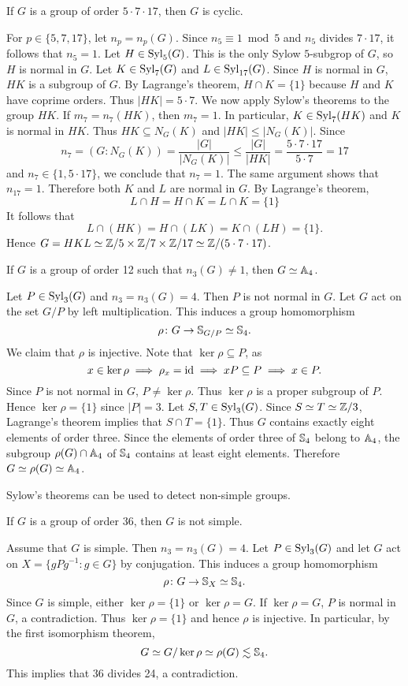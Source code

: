 \begin{example}
If $G$ is a group of order $5\cdot 7\cdot 17$, then $G$ is cyclic.

For $p\in\{5,7,17\}$, let $n_p=n_p(G)$. Since $n_5\equiv 1\bmod 5$ and $n_5$ divides $7\cdot 17$, it follows that 
$n_5=1$. Let $H\in\mathrm{Syl}_5(G)$. This is the only Sylow $5$-subgrop of $G$, 
so $H$ is normal in $G$. Let $K\in\mathrm{Syl}_7(G)$ and $L\in\mathrm{Syl}_{17}(G)$. Since $H$ is normal in $G$, $HK$ is a subgroup of $G$. By Lagrange's theorem, $H\cap K=\{1\}$ because $H$ and $K$ have coprime orders.
Thus  $|HK|=5\cdot 7$.
We now apply Sylow's theorems to the group $HK$. If $m_7=n_7(HK)$, then $m_7=1$. In particular, $K\in\mathrm{Syl}_7(HK)$ and $K$ is normal in $HK$. 
Thus $HK\subseteq N_G(K)$ and $|HK|\leq |N_G(K)|$. Since 
\[
n_7=(G:N_G(K))=\frac{|G|}{|N_G(K)|}\leq \frac{|G|}{|HK|}=\frac{5\cdot 7\cdot 17}{5\cdot 7}=17
\]
and $n_7\in\{1,5\cdot 17\}$, we conclude that
$n_7=1$. The same argument shows that
$n_{17}=1$. Therefore both $K$ and $L$ are normal in $G$. By
Lagrange's theorem, 
\[
L\cap H=H\cap K=L\cap K=\{1\}
\]
It follows that
\[
L\cap (HK)=H\cap (LK)=K\cap (LH)=\{1\}.
\]
Hence $G=HKL\simeq\mathbb{Z}/5\times\mathbb{Z}/7\times\mathbb{Z}/17\simeq\mathbb{Z}/(5\cdot 7\cdot 17)$.
\end{example}

\begin{example}
If $G$ is a group of order 12 such that 
$n_3(G)\ne1$, then $G\simeq\mathbb{A}_4$.

Let $P\in\mathrm{Syl}_3(G)$ and $n_3=n_3(G)=4$. Then $P$ is not normal in
$G$. Let $G$ act on the set $G/P$ by left multiplication. 
This induces a group homomorphism 
\[
\rho\colon G\to\mathbb{S}_{G/P}\simeq\mathbb{S}_4.
\]
We claim that $\rho$ is injective. Note that
$\ker\rho\subseteq P$, as 
\[
x\in\ker\rho\implies
\rho_x=\operatorname{id}\implies
xP\subseteq P\implies
x\in P.
\]
Since $P$ is not normal in $G$, $P\ne \ker\rho$. Thus $\ker\rho$ is a proper subgroup of $P$. Hence 
$\ker\rho=\{1\}$ since $|P|=3$.
Let $S,T\in\mathrm{Syl}_3(G)$. Since $S\simeq T\simeq\mathbb{Z}/3$, Lagrange's theorem implies that $S\cap T=\{1\}$. Thus $G$ 
contains exactly eight elements of order three. 
Since the elements of order three of $\mathbb{S}_4$ belong to $\mathbb{A}_4$, the subgroup $\rho(G)\cap\mathbb{A}_4$ of $\mathbb{S}_4$ contains at least
eight elements. Therefore $G\simeq\rho(G)\simeq\mathbb{A}_4$.
\end{example}

Sylow's theorems can be used to detect non-simple groups. 

\begin{example}
If $G$ is a group of order 36, then $G$ is not simple.

Assume that $G$ is simple. Then $n_3=n_3(G)=4$. 
Let $P\in\mathrm{Syl}_3(G)$ and let $G$ act on $X=\{gPg^{-1}:g\in G\}$ by conjugation. This induces a group homomorphism 
\[
\rho\colon G\to\mathbb{S}_X\simeq\mathbb{S}_4.
\]
Since $G$ is simple, either $\ker\rho=\{1\}$ or $\ker\rho=G$. If $\ker\rho=G$, $P$ is normal in $G$, a
contradiction. Thus $\ker\rho=\{1\}$ and hence
$\rho$ is injective. In particular, 
by the first isomorphism theorem, 
\[
G\simeq G/\ker\rho\simeq\rho(G)\lesssim\mathbb{S}_4.
\]
This implies that 36 divides 24, a contradiction. 
\end{example}

